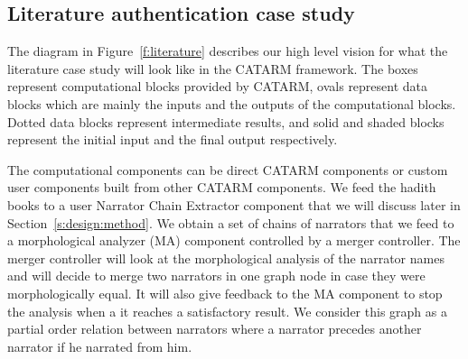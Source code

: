 \documentclass[12pt]{article}
\begin{document}
\subsection{Literature authentication case study}
\label{s:design:lit}

\begin{figure}
\end{figure}

The diagram in Figure~\ref{f:literature} describes our 
high level vision for what the literature case study
will look like in the CATARM framework. 
The boxes represent 
computational blocks provided by CATARM, 
ovals represent data blocks which are mainly the 
inputs and the outputs of the computational blocks. 
Dotted data blocks represent intermediate results,
and solid and shaded blocks represent the initial input 
and the final output respectively. 

The computational components can be direct CATARM components
or custom user components built from other CATARM components.
We feed the hadith books to a user Narrator Chain Extractor
component that we will discuss later in 
Section~\ref{s:design:method}. We  obtain a set of chains
of narrators that we feed to a morphological analyzer (MA) 
component controlled by a merger controller. 
The merger controller will look at the morphological analysis
of the narrator names and will decide to merge two narrators in 
one graph node in case they were morphologically equal. 
It will also give feedback to the MA component to stop the
analysis when a it reaches a satisfactory result.
We consider this graph as a partial order relation between 
narrators where a narrator precedes another narrator if 
he narrated from him. 
\end{document}
